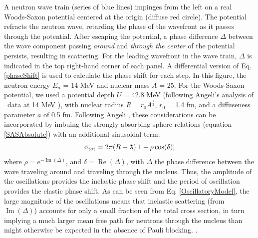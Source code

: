  A neutron wave train (series of
            blue lines) impinges from the left on a real Woods-Saxon
            potential centered at the origin (diffuse red circle). The potential
            refracts the neutron wave,
            retarding the phase of the wavefront as it passes through the
            potential. After escaping the potential, a phase difference $\Delta$ between
            the wave component passing \textit{around} and \textit{through the center}
            of the potential persists, resulting in scattering.
            For the leading wavefront in the wave train, $\Delta$ is indicated in
            the top right-hand corner of each panel. A differential version of
            Eq. \ref{phaseShift} is used to
            calculate the phase shift for each step. In this figure, the neutron
            energy $E_{n}$ = 14 MeV and nuclear mass $A$ = 25. For the Woods-Saxon potential,
            we used a potential depth $U$ = 42.8 MeV (following Angeli's analysis
            of \tot\ data at 14 MeV \cite{Angeli1970}), with nuclear radius $R = 
            r_{0}A^{\frac{1}{3}}$, $r_{0}$ = 1.4 fm, and a diffuseness parameter
        $a$ of 0.5 fm.
Following Angeli \cite{Angeli1970}, these considerations can be incorporated by
imbuing the strongly-absorbing sphere relations (equation \ref{SASAbsolute}) with an additional sinusoidal term:
\begin{equation} \label{OscillatoryModel}
    \tot = 2\pi (R+\lambdabar)[1 - \rho \cos(\delta)]
\end{equation}
where $\rho = e^{-\operatorname{Im}(\Delta)}$, and $\delta =
\operatorname{Re}(\Delta)$, with $\Delta$ the phase difference between the wave traveling
around and traveling through the nucleus. Thus, the amplitude of the oscillations provides the 
inelastic phase shift and the period of oscillation provides the elastic phase shift.
As can be seen from Eq. 
\ref{OscillatoryModel}, the large magnitude of the oscillations means that inelastic
scattering (from $\operatorname{Im}(\Delta)$) accounts for only a small fraction of the total cross section, in turn implying a 
much larger mean free path for neutrons through the nucleus 
than might otherwise be expected in the absence of Pauli blocking.
\cite{Mohr1955}.

